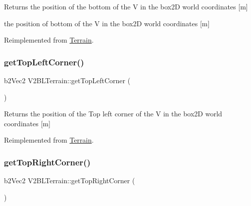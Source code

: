 \begin{DoxyReturn}{Returns}
the position of the bottom of the V in the box2D world coordinates \mbox{[}m\mbox{]}

the position of bottom of the V in the box2D world coordinates \mbox{[}m\mbox{]} 
\end{DoxyReturn}


Reimplemented from \mbox{\hyperlink{class_terrain_a26e1c7c05b8256015730df34d97d29c2}{Terrain}}.

\mbox{\label{class_v2_b_l_terrain_a57bfd1489ee3074d08513865f2197897}} 
\subsubsection{\texorpdfstring{get\+Top\+Left\+Corner()}{getTopLeftCorner()}}
{\footnotesize\ttfamily b2\+Vec2 V2\+B\+L\+Terrain\+::get\+Top\+Left\+Corner (\begin{DoxyParamCaption}{ }\end{DoxyParamCaption})\hspace{0.3cm}{\ttfamily [virtual]}}

\begin{DoxyReturn}{Returns}
the position of the Top left corner of the V in the box2D world coordinates \mbox{[}m\mbox{]} 
\end{DoxyReturn}


Reimplemented from \mbox{\hyperlink{class_terrain_a8a8629396e5cb03961649acdc23eacf2}{Terrain}}.

\mbox{\label{class_v2_b_l_terrain_a2a3dc6ef761a5ab416669ce5f793558b}} 
\subsubsection{\texorpdfstring{get\+Top\+Right\+Corner()}{getTopRightCorner()}}
{\footnotesize\ttfamily b2\+Vec2 V2\+B\+L\+Terrain\+::get\+Top\+Right\+Corner (\begin{DoxyParamCaption}{ }\end{DoxyParamCaption})\hspace{0.3cm}{\ttfamily [virtual]}}

